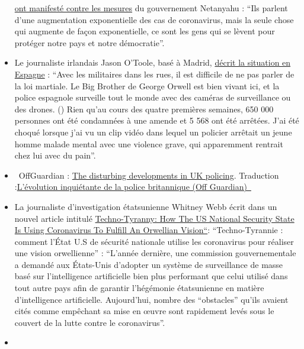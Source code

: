 \begin{itemize}
  \href{https://edition.cnn.com/2020/04/20/middleeast/israel-protest-social-distancing-intl/index.html}{ont
  manifesté contre les mesures} du gouvernement Netanyahu : ``Ils
  parlent d'une augmentation exponentielle des cas de coronavirus, mais
  la seule chose qui augmente de façon exponentielle, ce sont les gens
  qui se lèvent pour protéger notre pays et notre démocratie''.
\item
  Le journaliste irlandais Jason O'Toole, basé à Madrid,
  \href{https://www.rt.com/op-ed/486350-spain-tough-rules-covid-19-lockdown/}{décrit
  la situation en Espagne} : ``Avec les militaires dans les rues, il est
  difficile de ne pas parler de la loi martiale. Le Big Brother de
  George Orwell est bien vivant ici, et la police espagnole surveille
  tout le monde avec des caméras de surveillance ou des drones. () Rien
  qu'au cours des quatre premières semaines, 650 000 personnes ont été
  condamnées à une amende et 5 568 ont été arrêtées. J'ai été choqué
  lorsque j'ai vu un clip vidéo dans lequel un policier arrêtait un
  jeune homme malade mental avec une violence grave, qui apparemment
  rentrait chez lui avec du pain''.
\item
  ~OffGuardian :
  \href{https://off-guardian.org/2020/04/18/the-disturbing-developments-in-uk-policing/}{The
  disturbing developments in UK policing}. Traduction
  :\href{http://le-blog-sam-la-touch.over-blog.com/2020/04/l-evolution-inquietante-de-la-police-britannique-off-guardian.html}{L'évolution
  inquiétante de la police britannique (Off Guardian)~}
\item
  La journaliste d'investigation étatsunienne Whitney Webb écrit dans un
  nouvel article intitulé
  \href{https://www.thelastamericanvagabond.com/top-news/techno-tyranny-how-us-national-security-state-using-coronavirus-fulfill-orwellian-vision/}{Techno-Tyranny:
  How The US National Security State Is Using Coronavirus To Fulfill An
  Orwellian Vision``}: ``Techno-Tyrannie : comment l'État U.S de
  sécurité nationale utilise les coronavirus pour réaliser une vision
  orwellienne'' : ``L'année dernière, une commission gouvernementale a
  demandé aux États-Unis d'adopter un système de surveillance de masse
  basé sur l'intelligence artificielle bien plus performant que celui
  utilisé dans tout autre pays afin de garantir l'hégémonie étatsunienne
  en matière d'intelligence artificielle. Aujourd'hui, nombre des
  ``obstacles'' qu'ils avaient cités comme empêchant sa mise en œuvre
  sont rapidement levés sous le couvert de la lutte contre le
  coronavirus''.
\item

\end{itemize}
